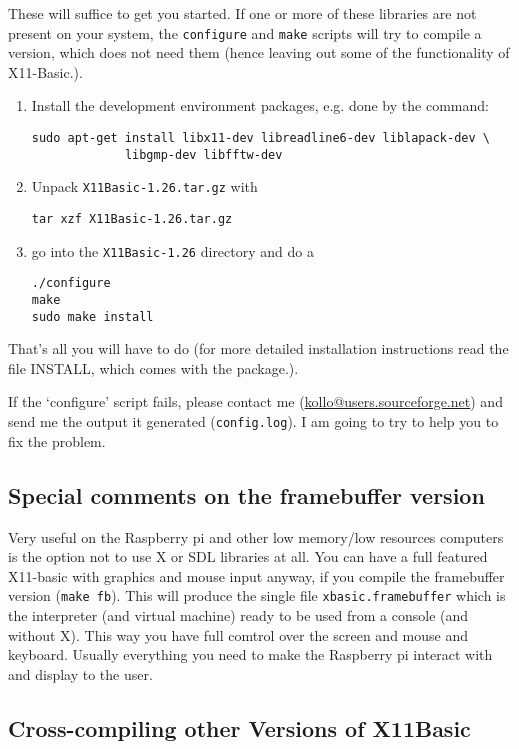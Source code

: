 These will suffice to get you started. If one or more of these libraries are
not present on your system, the \verb|configure| and \verb|make| scripts will
try to compile a version, which does not need them (hence leaving out some of
the functionality of X11-Basic.).

\begin{enumerate}
\item Install the development environment packages, e.g. done by the command:
\begin{verbatim}
sudo apt-get install libx11-dev libreadline6-dev liblapack-dev \
             libgmp-dev libfftw-dev 
\end{verbatim}

\item Unpack \verb|X11Basic-1.26.tar.gz| with 
\begin{verbatim}
tar xzf X11Basic-1.26.tar.gz
\end{verbatim}
\item go into the \verb|X11Basic-1.26| directory and do a 
\begin{verbatim}
./configure
make
sudo make install
\end{verbatim}
\end{enumerate}
That's all you will have to do (for more detailed installation instructions read
the file INSTALL, which comes with the package.).

If the `configure' script fails, please contact me
(\url{kollo@users.sourceforge.net}) and send me the output it generated
(\verb|config.log|). I am going to try to help you to fix the problem.

\subsection*{Special comments on the framebuffer version}

Very useful on the Raspberry pi and other low memory/low resources computers 
is the option not to use X or SDL libraries at all. You can have a full 
featured X11-basic with graphics and mouse input anyway, if you compile the 
framebuffer version (\verb|make fb|). This will produce the single file 
\verb|xbasic.framebuffer| which is the interpreter (and virtual machine) 
ready to be used from a console (and without X). This way you have full comtrol 
over the screen and mouse and keyboard. Usually everything you need to make the 
Raspberry pi interact with and display to the user. 

\subsection*{Cross-compiling other Versions of X11Basic}

